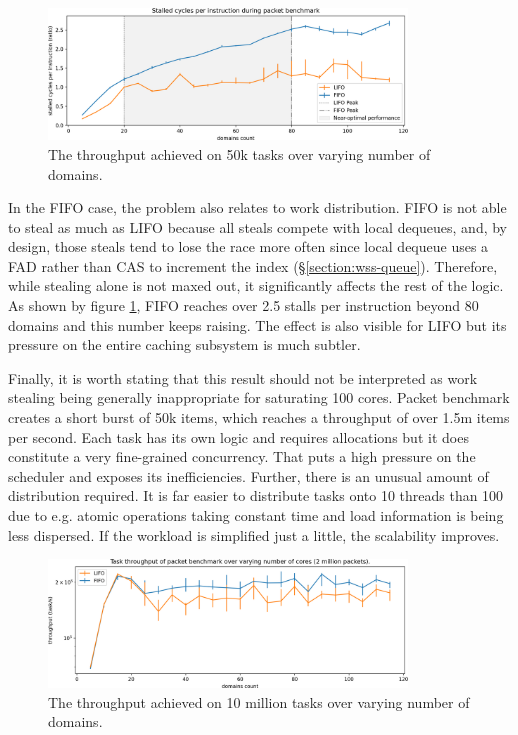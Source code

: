\documentclass[12pt,a4paper,twoside]{report}
\begin{document}
\begin{figure} 
     \centering 
     \includegraphics[width=0.85\textwidth]{eval/packet-basic-counters.png}
     \caption{The throughput achieved on 50k tasks over varying number of domains.}
    \label{fig:packet-counters}
\end{figure}

In the FIFO case, the problem also relates to work distribution. FIFO is not able to steal as much as LIFO because all steals compete with local dequeues, and, by design, those steals tend to lose the race more often since local dequeue uses a FAD rather than CAS to increment the index (\S\ref{section:wss-queue}). Therefore, while stealing alone is not maxed out, it significantly affects the rest of the logic. As shown by figure \ref{fig:packet-counters}, FIFO reaches over 2.5 stalls per instruction beyond 80 domains and this number keeps raising. The effect is also visible for LIFO but its pressure on the entire caching subsystem is much subtler.

Finally, it is worth stating that this result should not be interpreted as work stealing being generally inappropriate for saturating 100 cores. Packet benchmark creates a short burst of 50k items, which reaches a throughput of over 1.5m items per second. Each task has its own logic and requires allocations but it does constitute a very fine-grained concurrency. That puts a high pressure on the scheduler and exposes its inefficiencies. Further, there is an unusual amount of distribution required. It is far easier to distribute tasks onto 10 threads than 100 due to e.g. atomic operations taking constant time and load information is being less dispersed. If the workload is simplified just a little, the scalability improves. 

\begin{figure} 
     \centering
     \includegraphics[width=0.85\textwidth]{eval/packet-basic-10million-just-throughput.png}
     \caption{The throughput achieved on 10 million tasks over varying number of domains.}
    \label{fig:packet-10m-throughput}
\end{figure}
\end{document}
